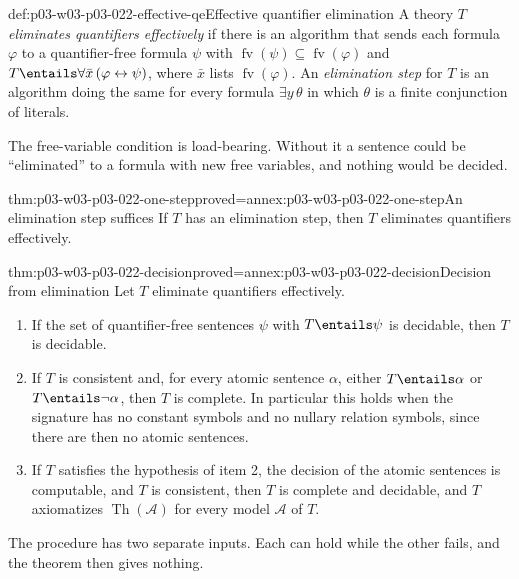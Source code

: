 \begin{hbdefinition}{def:p03-w03-p03-022-effective-qe}{Effective quantifier elimination}
A theory \(T\) \emph{eliminates quantifiers effectively} if there is an
algorithm that sends each formula \(\varphi\) to a quantifier-free formula
\(\psi\) with \(\operatorname{fv}(\psi)\subseteq\operatorname{fv}(\varphi)\) and
\(T\entails\forall\bar x\,(\varphi\leftrightarrow\psi)\), where \(\bar x\)
lists \(\operatorname{fv}(\varphi)\). An \emph{elimination step} for \(T\)
is an algorithm doing the same for every formula
\(\exists y\,\theta\) in which \(\theta\) is a finite conjunction of
literals.
\end{hbdefinition}

The free-variable condition is load-bearing. Without it a sentence could be
``eliminated'' to a formula with new free variables, and nothing would be
decided.

\begin{hblemma}{thm:p03-w03-p03-022-one-step}{proved=annex:p03-w03-p03-022-one-step}{An elimination step suffices}
If \(T\) has an elimination step, then \(T\) eliminates quantifiers
effectively.
\end{hblemma}

\begin{hbtheorem}{thm:p03-w03-p03-022-decision}{proved=annex:p03-w03-p03-022-decision}{Decision from elimination}
Let \(T\) eliminate quantifiers effectively.
\begin{enumerate}
\item If the set of quantifier-free sentences \(\psi\) with
  \(T\entails\psi\) is decidable, then \(T\) is decidable.
\item If \(T\) is consistent and, for every atomic sentence \(\alpha\),
  either \(T\entails\alpha\) or \(T\entails\neg\alpha\), then \(T\) is
  complete. In particular this holds when the signature has no constant
  symbols and no nullary relation symbols, since there are then no atomic
  sentences.
\item If \(T\) satisfies the hypothesis of item 2, the decision of the
  atomic sentences is computable, and \(T\) is consistent, then \(T\) is
  complete and decidable, and \(T\) axiomatizes \(\operatorname{Th}(\mathcal A)\) for every
  model \(\mathcal A\) of \(T\).
\end{enumerate}
\end{hbtheorem}

The procedure has two separate inputs. Each can hold while the other
fails, and the theorem then gives nothing.

